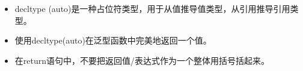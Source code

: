 \begin{itemize}
	\item decltype (auto)是一种占位符类型，用于从值推导值类型，从引用推导引用类型。
	\item 使用decltype(auto)在泛型函数中完美地返回一个值。
	\item 在return语句中，不要把返回值/表达式作为一个整体用括号括起来。
\end{itemize}


\newpage